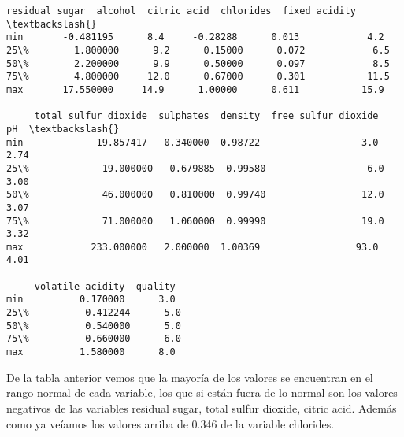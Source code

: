 \documentclass[11pt]{article}
\makeatletter
\newcommand{\boxspacing}{\kern\kvtcb@left@rule\kern\kvtcb@boxsep}
\newcommand{\prompt}[4]{
        {\ttfamily\llap{{\color{#2}[#3]:\hspace{3pt}#4}}\vspace{-\baselineskip}}
    }
\makeatother
\begin{document}
            \begin{tcolorbox}[breakable, size=fbox, boxrule=.5pt, pad at break*=1mm, opacityfill=0]
\prompt{Out}{outcolor}{44}{\boxspacing}
\begin{Verbatim}[commandchars=\\\{\}]
     residual sugar  alcohol  citric acid  chlorides  fixed acidity  \textbackslash{}
min       -0.481195      8.4     -0.28288      0.013            4.2
25\%        1.800000      9.2      0.15000      0.072            6.5
50\%        2.200000      9.9      0.50000      0.097            8.5
75\%        4.800000     12.0      0.67000      0.301           11.5
max       17.550000     14.9      1.00000      0.611           15.9

     total sulfur dioxide  sulphates  density  free sulfur dioxide    pH  \textbackslash{}
min            -19.857417   0.340000  0.98722                  3.0  2.74
25\%             19.000000   0.679885  0.99580                  6.0  3.00
50\%             46.000000   0.810000  0.99740                 12.0  3.07
75\%             71.000000   1.060000  0.99990                 19.0  3.32
max            233.000000   2.000000  1.00369                 93.0  4.01

     volatile acidity  quality
min          0.170000      3.0
25\%          0.412244      5.0
50\%          0.540000      5.0
75\%          0.660000      6.0
max          1.580000      8.0
\end{Verbatim}
\end{tcolorbox}
        
    De la tabla anterior vemos que la mayoría de los valores se encuentran
en el rango normal de cada variable, los que si están fuera de lo normal
son los valores negativos de las variables residual sugar, total sulfur
dioxide, citric acid. Además como ya veíamos los valores arriba de 0.346
de la variable chlorides.
\end{document}
